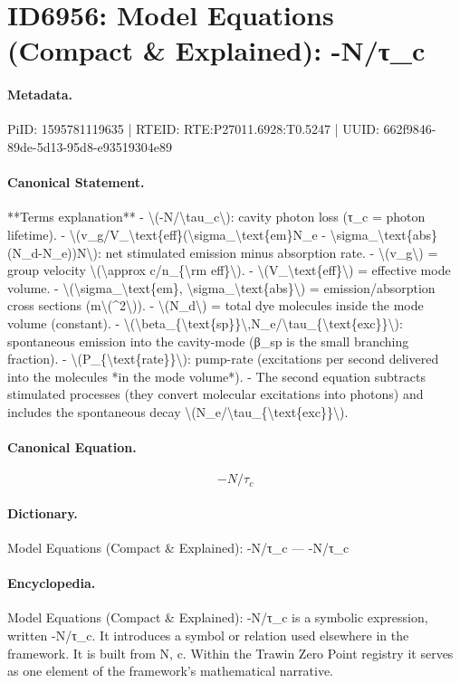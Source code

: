 \section*{ID6956: Model Equations (Compact \& Explained): -N/τ\_c}
\paragraph{Metadata.}
PiID: 1595781119635 | RTEID: RTE:P27011.6928:T0.5247 | UUID: 662f9846-89de-5d13-95d8-e93519304e89

\paragraph{Canonical Statement.}
**Terms explanation** - \textbackslash{}(-N/\textbackslash{}tau\_c\textbackslash{}): cavity photon loss (τ\_c = photon lifetime). - \textbackslash{}(v\_g/V\_\textbackslash{}text\{eff\}(\textbackslash{}sigma\_\textbackslash{}text\{em\}N\_e - \textbackslash{}sigma\_\textbackslash{}text\{abs\}(N\_d-N\_e))N\textbackslash{}): net stimulated emission minus absorption rate. - \textbackslash{}(v\_g\textbackslash{}) = group velocity \textbackslash{}(\textbackslash{}approx c/n\_\{\textbackslash{}rm eff\}\textbackslash{}). - \textbackslash{}(V\_\textbackslash{}text\{eff\}\textbackslash{}) = effective mode volume. - \textbackslash{}(\textbackslash{}sigma\_\textbackslash{}text\{em\}, \textbackslash{}sigma\_\textbackslash{}text\{abs\}\textbackslash{}) = emission/absorption cross sections (m\textbackslash{}(\textasciicircum{}2\textbackslash{})). - \textbackslash{}(N\_d\textbackslash{}) = total dye molecules inside the mode volume (constant). - \textbackslash{}(\textbackslash{}beta\_\{\textbackslash{}text\{sp\}\}\textbackslash{},N\_e/\textbackslash{}tau\_\{\textbackslash{}text\{exc\}\}\textbackslash{}): spontaneous emission into the cavity-mode (β\_sp is the small branching fraction). - \textbackslash{}(P\_\{\textbackslash{}text\{rate\}\}\textbackslash{}): pump-rate (excitations per second delivered into the molecules *in the mode volume*). - The second equation subtracts stimulated processes (they convert molecular excitations into photons) and includes the spontaneous decay \textbackslash{}(N\_e/\textbackslash{}tau\_\{\textbackslash{}text\{exc\}\}\textbackslash{}).

\paragraph{Canonical Equation.}
\[
-N/\tau_c
\]

\paragraph{Dictionary.}
Model Equations (Compact \& Explained): -N/τ\_c — -N/τ\_c

\paragraph{Encyclopedia.}
Model Equations (Compact \& Explained): -N/τ\_c is a symbolic expression, written -N/τ\_c. It introduces a symbol or relation used elsewhere in the framework. It is built from N, c. Within the Trawin Zero Point registry it serves as one element of the framework's mathematical narrative.
